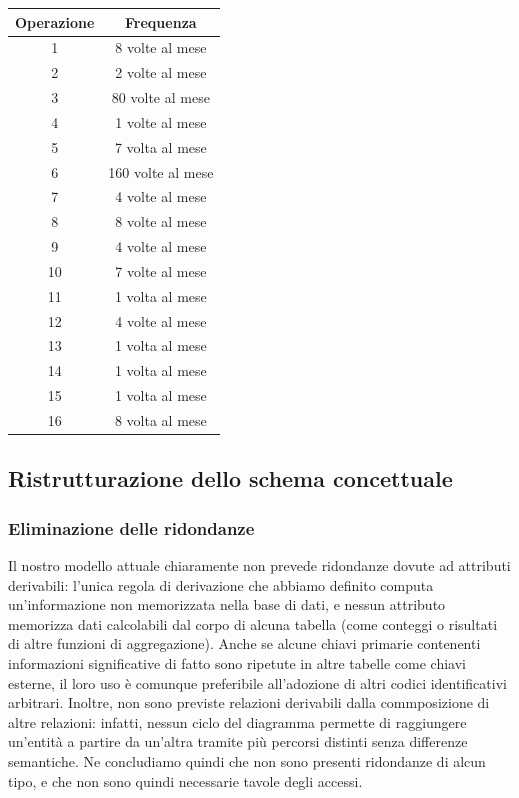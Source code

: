 \documentclass{article}
\begin{document}
\begin{center}\begin{tabular}{ |c|c| }
		\hline
		\textbf{Operazione} & \textbf{Frequenza} \\
		\hline
		1                   & 8 volte al mese    \\
		\hline
		2                   & 2 volte al mese    \\
		\hline
		3                   & 80 volte al mese   \\
		\hline
		4                   & 1 volte al mese    \\
		\hline
		5                   & 7 volta al mese    \\
		\hline
		6                   & 160 volte al mese  \\
		\hline
		7                   & 4 volte al mese    \\
		\hline
		8                   & 8 volte al mese    \\
		\hline
		9                   & 4 volte al mese    \\
		\hline
		10                  & 7 volte al mese    \\
		\hline
		11                  & 1 volta al mese    \\
		\hline
		12                  & 4 volte al mese    \\
		\hline
		13                  & 1 volta al mese    \\
		\hline
		14                  & 1 volta al mese    \\
		\hline
		15                  & 1 volta al mese    \\
		\hline
		16                  & 8 volta al mese    \\
		\hline
	\end{tabular}\end{center}

\subsection{Ristrutturazione dello schema concettuale}

\subsubsection{Eliminazione delle ridondanze}

Il nostro modello attuale chiaramente non prevede ridondanze dovute ad attributi
derivabili: l'unica regola di derivazione che abbiamo definito computa
un'informazione non memorizzata nella base di dati, e nessun attributo memorizza
dati calcolabili dal corpo di alcuna tabella (come conteggi o risultati di altre
funzioni di aggregazione). Anche se alcune chiavi primarie contenenti
informazioni significative di fatto sono ripetute in altre tabelle come chiavi
esterne, il loro uso è comunque preferibile all'adozione di altri codici
identificativi arbitrari. Inoltre, non sono previste relazioni derivabili dalla
commposizione di altre relazioni: infatti, nessun ciclo del diagramma permette
di raggiungere un'entità a partire da un'altra tramite più percorsi distinti
senza differenze semantiche. Ne concludiamo quindi che non sono presenti
ridondanze di alcun tipo, e che non sono quindi necessarie tavole degli accessi.
\end{document}
